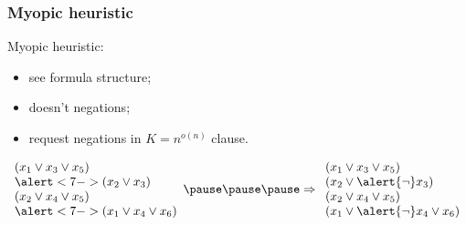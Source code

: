 \begin{frame}
	\frametitle{Myopic heuristic}
    \pause
    
    \begin{definition}
        Myopic heuristic:
        \pause
        \begin{itemize}
	        \item see formula structure;
        	\pause
        	\item doesn't negations;
        	\item<6-> request negations in $K = n^{o(n)}$ clause.
        \end{itemize}
    \end{definition}

    \pause
    $\begin{array}{l}
        (x_1 \vee x_3 \vee x_5) \\
        \alert<7->{(x_2 \vee x_3)} \\
        (x_2 \vee x_4 \vee x_5) \\
        \alert<7->{(x_1 \vee x_4 \vee x_6)} \\
    \end{array}
    \pause
    \pause
    \pause
    \Rightarrow
    \begin{array}{l}
        (x_1 \vee x_3 \vee x_5) \\
        (x_2 \vee \alert{\neg} x_3) \\
        (x_2 \vee x_4 \vee x_5) \\
        (x_1 \vee \alert{\neg} x_4 \vee x_6) \\
    \end{array}$
    
\end{frame}


